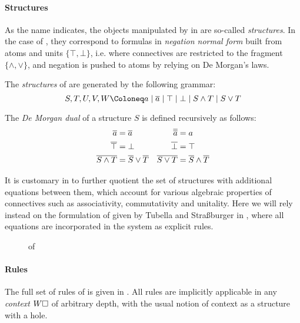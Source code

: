 \begin{scope}
\paragraph{Structures}

As the name indicates, the objects manipulated by  in  are so-called \emph{structures}. In the case of , they
correspond to formulas in \emph{negation normal form} built from atoms and units
$\{\top, \bot\}$, i.e. where connectives are restricted to the fragment
$\{\land, \lor\}$, and negation is pushed to atoms by relying on De Morgan's
laws.

\begin{definition}[Structure]
  The \emph{structures} of  are generated by the following grammar:
  $$S, T, U, V, W \Coloneq a \mid \dmdual{a} \mid \top \mid \bot \mid S \land T
  \mid S \lor T$$
\end{definition}

\begin{definition}
  The \emph{De Morgan dual} of a structure $S$ is defined recursively as
  follows:
  \begin{align*}
    \overline{a} &= \overline{a} & \overline{\overline{a}} &= a \\
    \overline{\top} &= \bot & \overline{\bot} &= \top \\
    \overline{S \land T} &= \overline{S} \lor \overline{T} & \overline{S \lor T} &= \overline{S} \land \overline{T}
  \end{align*}
\end{definition}

It is customary in  to further quotient the set of structures with additional
equations between them, which account for various algebraic properties of
connectives such as associativity, commutativity and unitality. Here we will
rely instead on the formulation of  given by Tubella and Straßburger in
\cite{tubella:hal-02390267}, where all equations are incorporated in the system
as explicit rules.

\begin{figure*}
  
  \caption{ of }
\end{figure*}

\paragraph{Rules}

The full set of rules of  is given in . All rules are
implicitly applicable in any \emph{context} $W\square$ of arbitrary depth, with
the usual notion of context as a structure with a hole.


\end{scope}
